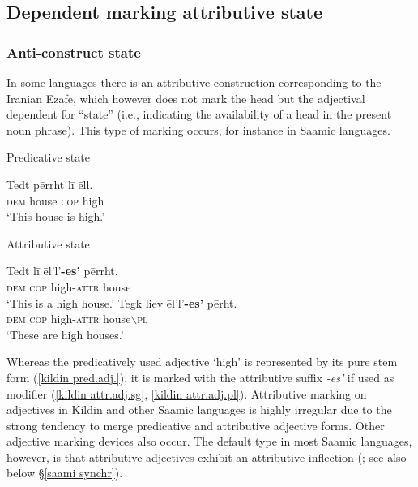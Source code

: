 \subsection{Dependent marking attributive state}\label{dep-marking state}
\subsubsection{Anti\hyp{}construct state} 
In some languages there is an attributive construction corresponding to the Iranian Ezafe, which however does not mark the head but the adjectival dependent for “state” (i.e., indicating the availability of a head in the present noun phrase). This type of marking occurs, for instance in Saamic languages.
\begin{exe}
\ex
{}
\begin{xlist}
\label{kildin pred.adj.}
\ex \rm{Predicative state}
\begin{xlist}
\ex
\gll Tedt 	pērrht l{ī} ēll.\\
	\textsc{dem} house \textsc{cop} high\\
\glt	‘This house is high.’
\end{xlist}
\ex \rm{Attributive state}
\begin{xlist}
\ex	
\label{kildin attr.adj.sg}
\gll Tedt	l{ī} 	ēl'l'\textbf{-es'} 		pērrht.\\
	\textsc{dem} \textsc{cop}	high-\textsc{attr}	house\\
\glt	‘This is a high house.’
\ex	
\label{kildin attr.adj.pl}
\gll Tegk 	liev 	ēl'l'\textbf{-es'}		pērht.\\	
	\textsc{dem}	\textsc{cop}	high-\textsc{attr} house$\backslash$\textsc{pl}\\
\glt	‘These are high houses.’
\end{xlist}
\end{xlist}
\end{exe}
Whereas the predicatively used adjective ‘high’ is represented by its pure stem form (\ref{kildin pred.adj.}), it is marked with the attributive suffix \textit{-es'} if used as modifier (\ref{kildin attr.adj.sg}, \ref{kildin attr.adj.pl}). Attributive marking on adjectives in Kildin and other Saamic languages is highly irregular due to the strong tendency to merge predicative and attributive adjective forms. Other adjective marking devices also occur. The default type in most Saamic languages, however, is that attributive adjectives exhibit an attributive inflection (\citealt{riesler2006b}; see also below \S\ref{saami synchr}).

